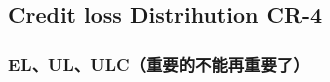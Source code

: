 






\subsection{Credit loss Distrihution CR-4}




\subsubsection{EL、UL、ULC（重要的不能再重要了）}

\renewcommand{\arraystretch}{2}

\begin{center}
\end{center}

